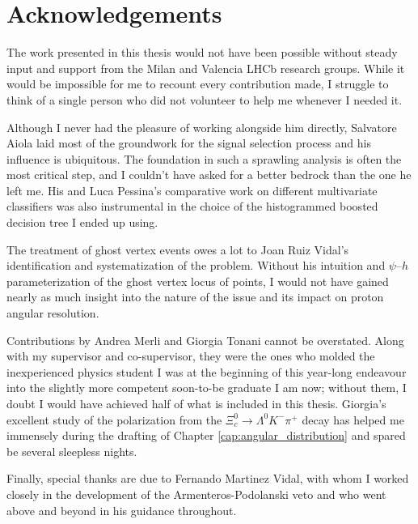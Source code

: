 \chapter*{Acknowledgements}

The work presented in this thesis would not have been possible without steady input and support from the Milan and Valencia LHCb research groups.
While it would be impossible for me to recount every contribution made, I struggle to think of a single person who did not volunteer to help me whenever I needed it. 

Although I never had the pleasure of working alongside him directly, Salvatore Aiola laid most of the groundwork for the \demonstratorshort signal selection process and his influence is ubiquitous.
The foundation in such a sprawling analysis is often the most critical step, and I couldn't have asked for a better bedrock than the one he left me.
His and Luca Pessina's comparative work on different multivariate classifiers was also instrumental in the choice of the histogrammed boosted decision tree I ended up using.

The treatment of ghost vertex \lambdadecay events owes a lot to Joan Ruiz Vidal's identification and systematization of the problem.
Without his intuition and $\psi$--$h$ parameterization of the ghost vertex locus of points, I would not have gained nearly as much insight into the nature of the issue and its impact on proton angular resolution.

Contributions by Andrea Merli and Giorgia Tonani cannot be overstated.
Along with my supervisor and co-supervisor, they were the ones who molded the inexperienced physics student I was at the beginning of this year-long endeavour into the slightly more competent soon-to-be graduate I am now;
without them, I doubt I would have achieved half of what is included in this thesis.
Giorgia's excellent study of the \lz polarization from the $\Xi_c^0 \rightarrow \Lambda^0 K^- \pi^+$ decay has helped me immensely during the drafting of Chapter \ref{cap:angular_distribution} and spared be several sleepless nights.

Finally, special thanks are due to Fernando Martinez Vidal, with whom I worked closely in the development of the Armenteros-Podolanski veto and who went above and beyond in his guidance throughout.